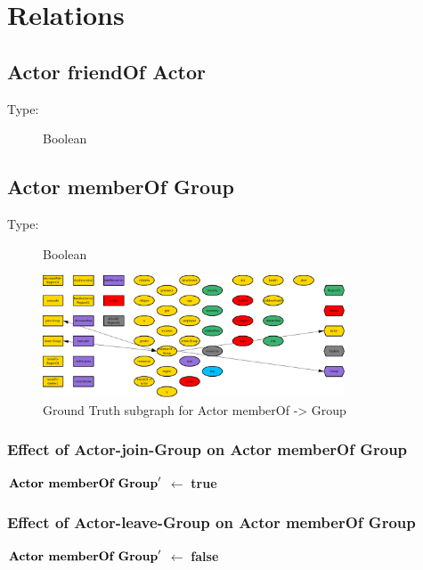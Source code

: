 \documentclass{article}%
\begin{document}
%
\section{Relations}%
\label{sec:Relations}%
\subsection{Actor friendOf Actor}%
\label{subsec:Actor friendOf Actor}%
\begin{description}%
\item[Type:]%
Boolean%
\end{description}

%
\subsection{Actor memberOf Group}%
\label{subsec:Actor memberOf Group}%
\begin{description}%
\item[Type:]%
Boolean%
\end{description}%


\begin{figure}[ht]%
\centering%
\includegraphics[width=0.8\textwidth]{images/ActormemberOf->Group.png}%
\caption{Ground Truth subgraph for Actor memberOf {-}> Group}%
\end{figure}

%
\subsubsection{Effect of Actor{-}join{-}Group on Actor memberOf Group}%
\label{ssubsec:Effect of Actor{-}join{-}Group on Actor memberOf Group}%
\begin{flushleft}%
$\mbox{\textbf{Actor memberOf Group}} '$%
$\leftarrow$%
\textbf{true}%
\end{flushleft}

%
\subsubsection{Effect of Actor{-}leave{-}Group on Actor memberOf Group}%
\label{ssubsec:Effect of Actor{-}leave{-}Group on Actor memberOf Group}%
\begin{flushleft}%
$\mbox{\textbf{Actor memberOf Group}} '$%
$\leftarrow$%
\textbf{false}%
\end{flushleft}
\end{document}
